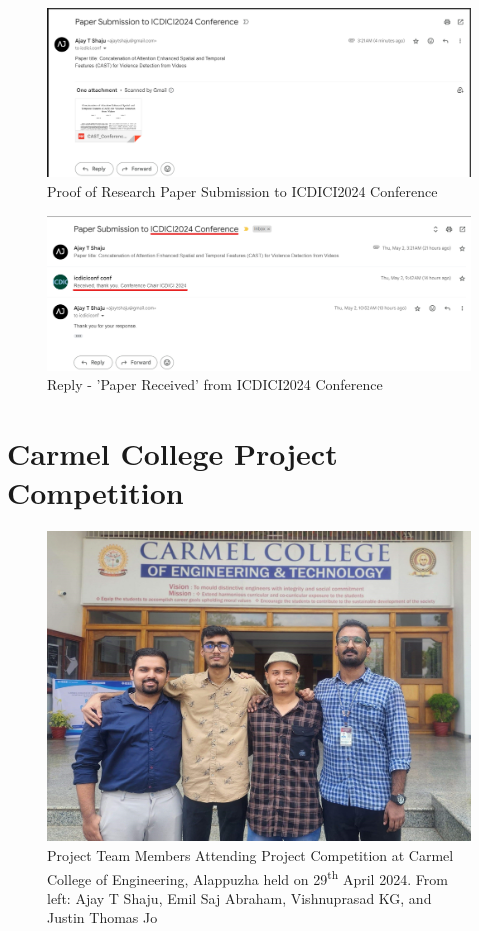 \begin{figure}[h]
    \centering
    \includegraphics[width=0.8\linewidth]{Images/new_conf.png}
    \caption{Proof of Research Paper Submission to ICDICI2024 Conference}
    \label{fig:confSubmitted}
\end{figure}

\vspace{1cm}

\begin{figure}[h]
    \centering
    \includegraphics[width=0.8\linewidth]{Images/conf_reply.png}
    \caption{Reply - 'Paper Received' from ICDICI2024 Conference}
    \label{fig:confReply}
\end{figure}

\clearpage

\section{Carmel College Project Competition}

\begin{figure}[htbp!]
    \centering
    \includegraphics[width=0.85\linewidth]{Images/main_p_team_at_carmel_clg.jpg}
    \caption[Project Team members attending Project Competition]{Project Team Members Attending Project Competition at Carmel College of Engineering, Alappuzha held on 29\textsuperscript{th} April 2024. From left: Ajay T Shaju, Emil Saj Abraham, Vishnuprasad KG, and Justin Thomas Jo}
    \label{ccetComp}
\end{figure}

